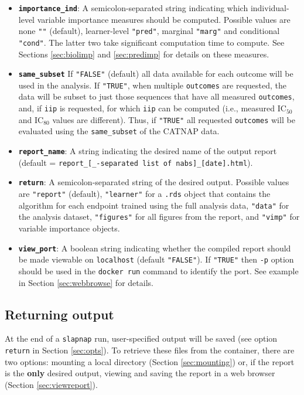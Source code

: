 \documentclass[
]{article}
\begin{document}
\begin{itemize}
\item
  \textbf{\texttt{importance\_ind}}: A semicolon-separated string indicating which individual-level variable importance measures should be computed. Possible values are none \texttt{""} (default), learner-level \texttt{"pred"}, marginal \texttt{"marg"} and conditional \texttt{"cond"}. The latter two take significant computation time to compute. See Sections \ref{sec:biolimp} and \ref{sec:predimp} for details on these measures.
\item
  \textbf{\texttt{same\_subset}} If \texttt{"FALSE"} (default) all data available for each outcome will be used in the analysis. If \texttt{"TRUE"}, when multiple \texttt{outcomes} are requested, the data will be subset to just those sequences that have all measured \texttt{outcomes}, and, if \texttt{iip} is requested, for which \texttt{iip} can be computed (i.e., measured IC\(_{50}\) and IC\(_{80}\) values are different). Thus, if \texttt{"TRUE"} all requested \texttt{outcomes} will be evaluated using the \texttt{same\_subset} of the CATNAP data.
\item
  \textbf{\texttt{report\_name}}: A string indicating the desired name of the output report (default = \texttt{report\_{[}\_-separated\ list\ of\ nabs{]}\_{[}date{]}.html}).
\item
  \textbf{\texttt{return}}: A semicolon-separated string of the desired output. Possible values are \texttt{"report"} (default), \texttt{"learner"} for a \texttt{.rds} object that contains the algorithm for each endpoint trained using the full analysis data, \texttt{"data"} for the analysis dataset, \texttt{"figures"} for all figures from the report, and \texttt{"vimp"} for variable importance objects.
\item
  \textbf{\texttt{view\_port}}: A boolean string indicating whether the compiled report should be made viewable on \texttt{localhost} (default \texttt{"FALSE"}). If \texttt{"TRUE"} then \texttt{-p} option should be used in the \texttt{docker\ run} command to identify the port. See example in Section \ref{sec:webbrowse} for details.
\end{itemize}

\hypertarget{returning-output}{%
\subsection{Returning output}\label{returning-output}}

At the end of a \texttt{slapnap} run, user-specified output will be saved (see option \texttt{return} in Section \ref{sec:opts}). To retrieve these files from the container, there are two options: mounting a local directory (Section \ref{sec:mounting}) or, if the report is the \textbf{only} desired output, viewing and saving the report in a web browser (Section \ref{sec:viewreport}).
\end{document}
